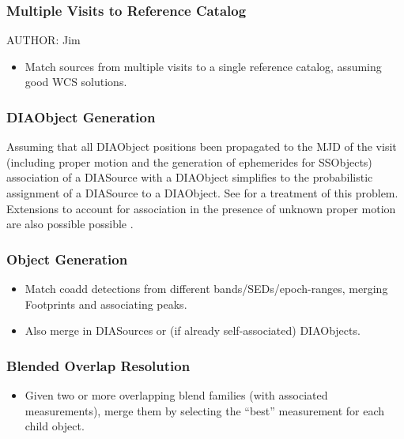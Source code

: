 


\subsubsection{Multiple Visits to Reference Catalog}
\label{sec:acJointCalMatching}
AUTHOR: Jim
\begin{itemize}
\item Match sources from multiple visits to a single reference catalog, assuming good WCS solutions.
\end{itemize}

\subsubsection{DIAObject Generation}
\label{sec:acDIAObjectGeneration}

Assuming that all DIAObject positions been propagated to the MJD of
the visit (including proper motion and the generation of ephemerides
for SSObjects) association of a DIASource with a DIAObject simplifies
to the probabilistic assignment of a DIASource to a DIAObject. See 
\cite{2008ApJ...679..301B} for a treatment of this problem.  Extensions
to account for association in the presence of unknown proper motion are
also possible possible \citep{2010ApJ...719...59K}.


\subsubsection{Object Generation}
\label{sec:acObjectGeneration}
\begin{itemize}
\item Match coadd detections from different bands/SEDs/epoch-ranges, merging Footprints and associating peaks.
\item Also merge in DIASources or (if already self-associated) DIAObjects.
\end{itemize}

\subsubsection{Blended Overlap Resolution}
\label{sec:acBlendedOverlapResolution}
\begin{itemize}
\item Given two or more overlapping blend families (with associated measurements), merge them by selecting the ``best'' measurement for each child object.
\end{itemize}

